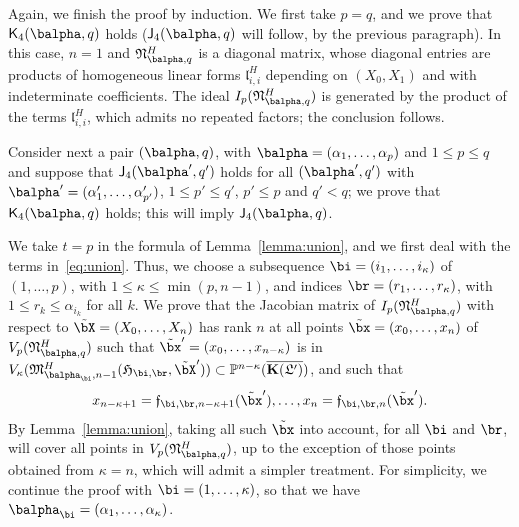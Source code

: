 \documentclass[12pt]{article}
\begin{document}
Again, we finish the proof by induction. We first take $p=q$, and we
prove that $\assJ_4(\balpha,q)$ holds ($\assI_4(\balpha,q)$ will
follow, by the previous paragraph). In this case, $n=1$ and
$\mathfrak{N}^H_{\balpha,q}$ is a diagonal matrix, whose diagonal
entries are products of homogeneous linear forms
$\mathfrak{l}^H_{i,i}$ depending on $(X_0,X_1)$ and with indeterminate
coefficients. The ideal $I_p(\mathfrak{N}^H_{\balpha,q})$ is generated
by the product of the terms $\mathfrak{l}^H_{i,i}$, which admits no
repeated factors; the conclusion follows.

Consider next a pair $(\balpha,q)$, with
$\balpha=(\alpha_1,\dots,\alpha_p)$ and $1 \le p \le q$ and suppose
that $\assI_4(\balpha',q')$ holds for all $(\balpha',q')$ with
$\balpha'=(\alpha'_1,\dots,\alpha'_{p'})$, $1 \le p' \le q'$, $p' \le
p$ and $q' < q$; we prove that $\assJ_4(\balpha,q)$ holds; this will
imply $\assI_4(\balpha,q)$.

We take $t=p$ in the formula of Lemma~\ref{lemma:union}, and we first
deal with the terms in~\eqref{eq:union}.  Thus, we choose a
subsequence $\bi=(i_1,\dots,i_\kappa)$ of $(1,\dots,p)$, with $1 \le \kappa\le
\min(p,n-1)$, and indices $\br=(r_1,\dots,r_\kappa)$, with $ 1\le r_k \le
\alpha_{i_k}$ for all $k$. We prove that the Jacobian matrix of $I_p(\mathfrak{N}^H_{\balpha,q})$
with respect to $\tilde\bX=(X_0,\dots,X_n)$ has rank $n$ at all points $\tilde\bx=(x_0,\dots,x_n)$ of
$V_p(\mathfrak{N}^H_{\balpha,q})$  such that
$\tilde\bx'=(x_0,\dots,x_{n-\kappa})$ is in
$V_\kappa(\mathfrak{M}^H_{\balpha_\bi,n-1}(\mathfrak{H}_{\bi,\br},\tilde\bX')) \subset
\P^{n-\kappa}(\KKGpbar)$, and such that
\begin{align}\label{eq:subsX}
  x_{n-\kappa+1}=\mathfrak{f}_{\bi,\br,n-\kappa+1}(\tilde\bx'),\dots,x_{n}=\mathfrak{f}_{\bi,\br,n}(\tilde\bx').
\end{align}
By Lemma~\ref{lemma:union}, taking all such $\tilde\bx$ into account,
for all $\bi$ and $\br$, will cover all points in
$V_p(\mathfrak{N}^H_{\balpha,q})$, up to the exception of those points
obtained from $\kappa=n$, which will admit a simpler treatment.
For simplicity, we continue the proof with $\bi=(1,\dots,\kappa)$, so
that we have $\balpha_\bi=(\alpha_1,\dots,\alpha_\kappa)$.  
\end{document}
